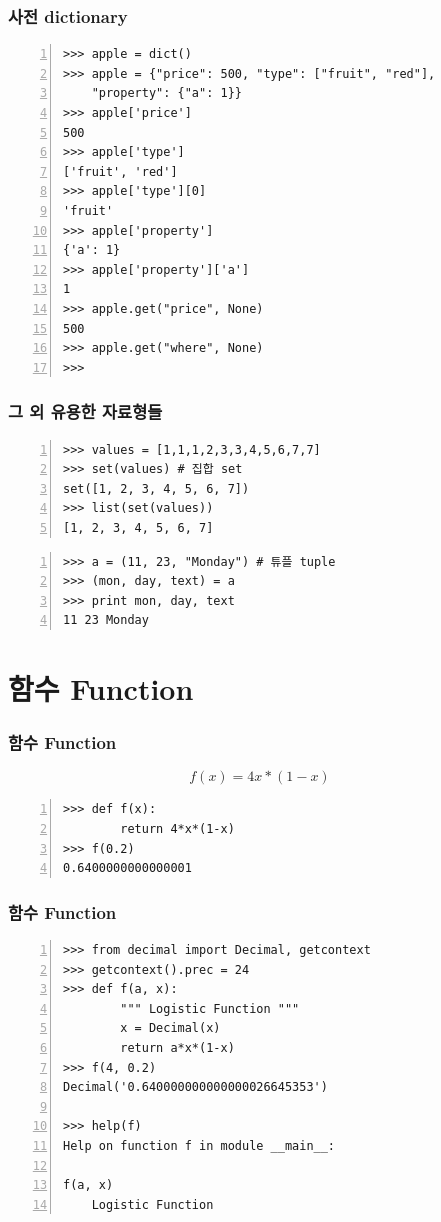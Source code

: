 \documentclass[10pt]{beamer}
\begin{document}
\begin{frame}[fragile]
\frametitle{사전 dictionary}
\begin{Verbatim}[numbers=left]
>>> apple = dict()
>>> apple = {"price": 500, "type": ["fruit", "red"],
    "property": {"a": 1}}
>>> apple['price']
500
>>> apple['type']
['fruit', 'red']
>>> apple['type'][0]
'fruit'
>>> apple['property']
{'a': 1}
>>> apple['property']['a']
1
>>> apple.get("price", None)
500
>>> apple.get("where", None)
>>>
\end{Verbatim}
\end{frame}

\begin{frame}[fragile]
\frametitle{그 외 유용한 자료형들}
\begin{Verbatim}[numbers=left]
>>> values = [1,1,1,2,3,3,4,5,6,7,7]
>>> set(values) # 집합 set
set([1, 2, 3, 4, 5, 6, 7])
>>> list(set(values))
[1, 2, 3, 4, 5, 6, 7]
\end{Verbatim}
\vspace{2mm}
\begin{Verbatim}[numbers=left]
>>> a = (11, 23, "Monday") # 튜플 tuple
>>> (mon, day, text) = a
>>> print mon, day, text
11 23 Monday
\end{Verbatim}
\end{frame}

\section{함수 Function}
\begin{frame}[fragile]
\frametitle{함수 Function}
\begin{equation*}
f(x) = 4x*(1-x)
\end{equation*}
\begin{Verbatim}[numbers=left,commandchars=\\\{\}]
>>> def f(x):
        return 4*x*(1-x)
>>> f(0.2)
0.6400000000000001
\end{Verbatim}
\end{frame}

\begin{frame}[fragile]
\frametitle{함수 Function}
\begin{Verbatim}[numbers=left,commandchars=\\\{\}]
>>> from decimal import Decimal, getcontext
>>> getcontext().prec = 24
>>> def f(a, x):
        """ Logistic Function """
        x = Decimal(x)
        return a*x*(1-x)
>>> f(4, 0.2)
Decimal('0.640000000000000026645353')

>>> help(f)
Help on function f in module __main__:

f(a, x)
    Logistic Function
\end{Verbatim}
\end{frame}
\end{document}
